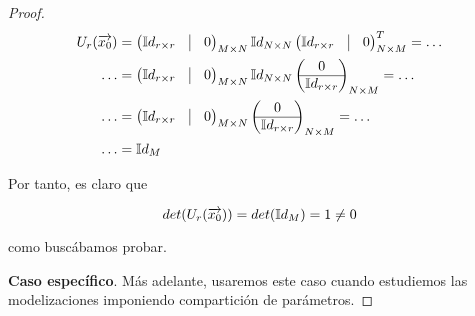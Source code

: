 \begin{proof}
    \begin{equation}
        \begin{split}
            U_r(\nv{x_0}) &= \begin{pmatrix}
                \mathbb{I}d_{r \times r} & \vline & 0 \\
            \end{pmatrix}_{M \times N}
            \mathbb{I}d_{N \times N}
            \begin{pmatrix}
                \mathbb{I}d_{r \times r} & \vline & 0 \\
            \end{pmatrix}^T_{N \times M} = \ldots \\
            \ldots &= \begin{pmatrix}
                \mathbb{I}d_{r \times r} & \vline & 0 \\
            \end{pmatrix}_{M \times N}
            \mathbb{I}d_{N \times N}
            \begin{pmatrix}
                0 \\
                \hline
                \mathbb{I}d_{r \times r}
            \end{pmatrix}_{N \times M} = \ldots \\
            \ldots &= \begin{pmatrix}
                \mathbb{I}d_{r \times r} & \vline & 0 \\
            \end{pmatrix}_{M \times N}
            \begin{pmatrix}
                0 \\
                \hline
                \mathbb{I}d_{r \times r}
            \end{pmatrix}_{N \times M} = \ldots \\
            \ldots &= \mathbb{I}d_M
        \end{split}
    \end{equation}

    Por tanto, es claro que

    \begin{equation}
        det(U_r(\overrightarrow{x_0})) = det(\mathbb{I}d_M) = 1 \neq 0
    \end{equation}

    como buscábamos probar.

    \textbf{Caso específico}. Más adelante, usaremos este caso cuando estudiemos las modelizaciones imponiendo compartición de parámetros.


\end{proof}
